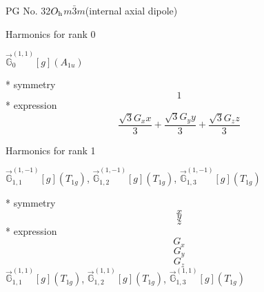 \documentclass[fleqn,8pt]{jsarticle}
\begin{document}
\setcounter{MaxMatrixCols}{32}

\renewcommand{\tablename}{Table~}
\renewcommand{\figurename}{Figure~}
\begin{center}
\LARGE
PG No. 32\quad$O_{\rm h}$\quad$m\bar{3}m$\quad[ cubic ] (internal axial dipole)
\end{center}

\noindent * Harmonics for rank 0

\noindent\quad $\vec{\mathbb{G}}_{0}^{(1,1)}[g](A_{1u})$

\noindent\quad ** symmetry
\begin{dmath*}
1
\end{dmath*}
\noindent\quad ** expression
\begin{dmath*}
\frac{\sqrt{3} G_{x} x}{3} + \frac{\sqrt{3} G_{y} y}{3} + \frac{\sqrt{3} G_{z} z}{3}
\end{dmath*}

\noindent * Harmonics for rank 1

\noindent\quad $\vec{\mathbb{G}}_{1,1}^{(1,-1)}[g](T_{1g})$, $\vec{\mathbb{G}}_{1,2}^{(1,-1)}[g](T_{1g})$, $\vec{\mathbb{G}}_{1,3}^{(1,-1)}[g](T_{1g})$

\noindent\quad ** symmetry
\begin{dmath*}
x
\end{dmath*}
\begin{dmath*}
y
\end{dmath*}
\begin{dmath*}
z
\end{dmath*}
\noindent\quad ** expression
\begin{dmath*}
G_{x}
\end{dmath*}
\begin{dmath*}
G_{y}
\end{dmath*}
\begin{dmath*}
G_{z}
\end{dmath*}
\noindent\quad $\vec{\mathbb{G}}_{1,1}^{(1,1)}[g](T_{1g})$, $\vec{\mathbb{G}}_{1,2}^{(1,1)}[g](T_{1g})$, $\vec{\mathbb{G}}_{1,3}^{(1,1)}[g](T_{1g})$
\end{document}

